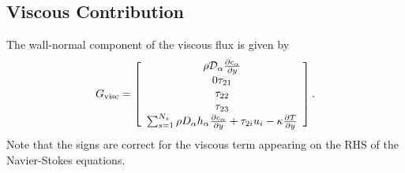 %


\subsection{Viscous Contribution}
\label{sec:viscous_implicit_operator}
The wall-normal component of the viscous flux is given by
%
\begin{equation*}
G_{\mathrm{visc}} = \left[ \begin{array}{c}
\rho \mathcal{D}_{\alpha} \frac{\partial c_{\alpha}}{\partial y} \\
0 
\tau_{21} \\
\tau_{22} \\
\tau_{23} \\
\sum_{s=1}^{N_s} \rho D_{\alpha} h_{\alpha} \frac{\partial c_{\alpha}}{\partial y} + \tau_{2i} u_i - \kappa \frac{\partial T}{\partial y}
\end{array} \right].
\end{equation*}
% 
Note that the signs are correct for the viscous term appearing on the
RHS of the Navier-Stokes equations.

